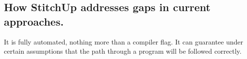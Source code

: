 %
%

\subsection{How StitchUp addresses gaps in current approaches.}
It is fully automated, nothing more than a compiler flag. It can guarantee under certain assumptions that the
path through a program will be followed correctly.
